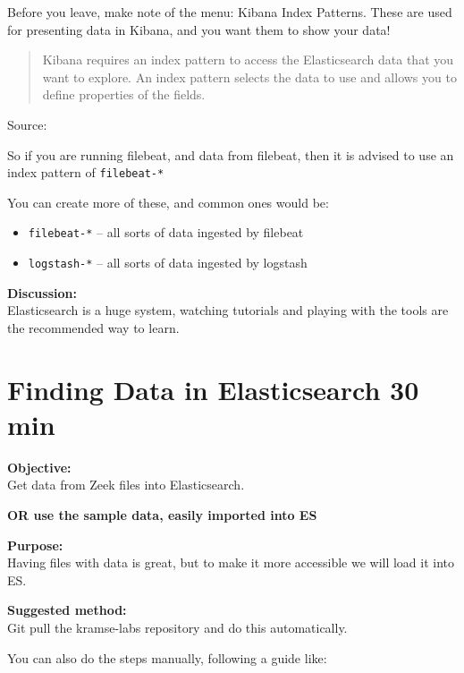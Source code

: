 \documentclass[a4paper,11pt,notitlepage]{report}
\begin{document}
Before you leave, make note of the menu: Kibana Index Patterns. These are used for presenting data in Kibana, and you want them to show your data!

\begin{quote}
Kibana requires an index pattern to access the Elasticsearch data that you want to explore. An index pattern selects the data to use and allows you to define properties of the fields.
\end{quote}
Source: 

So if you are running filebeat, and data from filebeat, then it is advised to use an index pattern of \verb+filebeat-*+


You can create more of these, and common ones would be:
\begin{itemize}
\item \verb+filebeat-*+ -- all sorts of data ingested by filebeat
\item \verb+logstash-*+ -- all sorts of data ingested by logstash

\end{itemize}

{\bf Discussion:}\\
Elasticsearch is a huge system, watching tutorials and playing with the tools are the recommended way to learn.


\chapter{Finding Data in Elasticsearch 30 min}
\label{ex:zeek-json-es}

{\bf Objective:}\\
Get data from Zeek files into Elasticsearch.

{\bf OR use the sample data, easily imported into ES}

{\bf Purpose:}\\
Having files with data is great, but to make it more accessible we will load it into ES.


{\bf Suggested method:}\\
Git pull the kramse-labs repository and do this automatically.

You can also do the steps manually, following a guide like:\\
\end{document}
